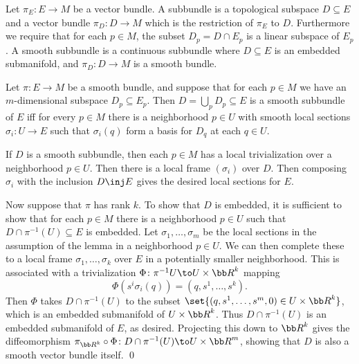 \bdefn

    Let $\pi_E\colon E\to M$ be a vector bundle.
    A {\emphcolor subbundle} is a topological subspace $D\subseteq E$ and a vector bundle $\pi_D\colon D\to M$ which is the restriction of $\pi_E$ to $D$.
    Furthermore we require that for each $p\in M$, the subset $D_p=D\cap E_p$ is a linear subspace of $E_p$.
    A {\emphcolor smooth subbundle} is a continuous subbundle where $D\subseteq E$ is an embedded submanifold, and $\pi_D\colon D\to M$ is a smooth bundle.

\edefn

\blemm

    Let $\pi\colon E\to M$ be a smooth bundle, and suppose that for each $p\in M$ we have an $m$-dimensional subspace $D_p\subseteq E_p$.
    Then $D=\bigcup_pD_p\subseteq E$ is a smooth subbundle of $E$ iff for every $p\in M$ there is a neighborhood $p\in U$ with smooth local sections $\sigma_i\colon U\to E$
    such that $\sigma_i(q)$ form a basis for $D_q$ at each $q\in U$.

\elemm

\bproof

    If $D$ is a smooth subbundle, then each $p\in M$ has a local trivialization over a neighborhood $p\in U$.
    Then there is a local frame $(\sigma_i)$ over $D$.
    Then composing $\sigma_i$ with the inclusion $D\inj E$ gives the desired local sections for $E$.

    Now suppose that $\pi$ has rank $k$.
    To show that $D$ is embedded, it is sufficient to show that for each $p\in M$ there is a neighborhood $p\in U$ such that $D\cap\pi^{-1}(U)\subseteq E$ is embedded.
    Let $\sigma_1,\dots,\sigma_m$ be the local sections in the assumption of the lemma in a neighborhood $p\in U$.
    We can then complete these to a local frame $\sigma_1,\dots,\sigma_k$ over $E$ in a potentially smaller neighborhood.
    This is associated with a trivialization $\Phi\colon\pi^{-1}U\to U\times\bR^k$ mapping
    $$ \Phi(s^i\sigma_i(q)) = (q,s^1,\dots,s^k) . $$
    Then $\Phi$ takes $D\cap\pi^{-1}(U)$ to the subset $\set{(q,s^1,\dots,s^m,0)\in U\times\bR^k}$, which is an embedded submanifold of $U\times\bR^k$.
    Thus $D\cap\pi^{-1}(U)$ is an embedded submanifold of $E$, as desired.
    Projecting this down to $\bR^k$ gives the diffeomorphism $\pi_{\bR^k}\circ\Phi\colon D\cap\pi^{-1}(U)\to U\times\bR^m$, showing that $D$ is also a smooth vector bundle itself.
    \qed

\eproof

\bthrm

